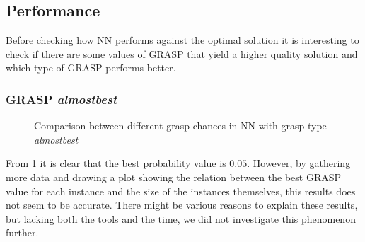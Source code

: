 \subsection{Performance}

Before checking how NN performs against the optimal solution it is interesting to check if there are some values of GRASP that yield a higher quality solution and which type of GRASP performs better.

\subsubsection{GRASP \textit{almostbest}}

\begin{figure}[H]
	\centering
	\caption{Comparison between different grasp chances in NN with grasp type \textit{almostbest}}
    \label{fig:nnAlmostbestCmp0}
\end{figure}

From \figurename{ \ref{fig:nnAlmostbestCmp0}} it is clear that the best probability value is $0.05$.
However, by gathering more data and drawing a plot showing the relation between the best GRASP value for each instance and the size of the instances themselves, this results does not seem to be accurate.
There might be various reasons to explain these results, but lacking both the tools and the time, we did not investigate this phenomenon further.


